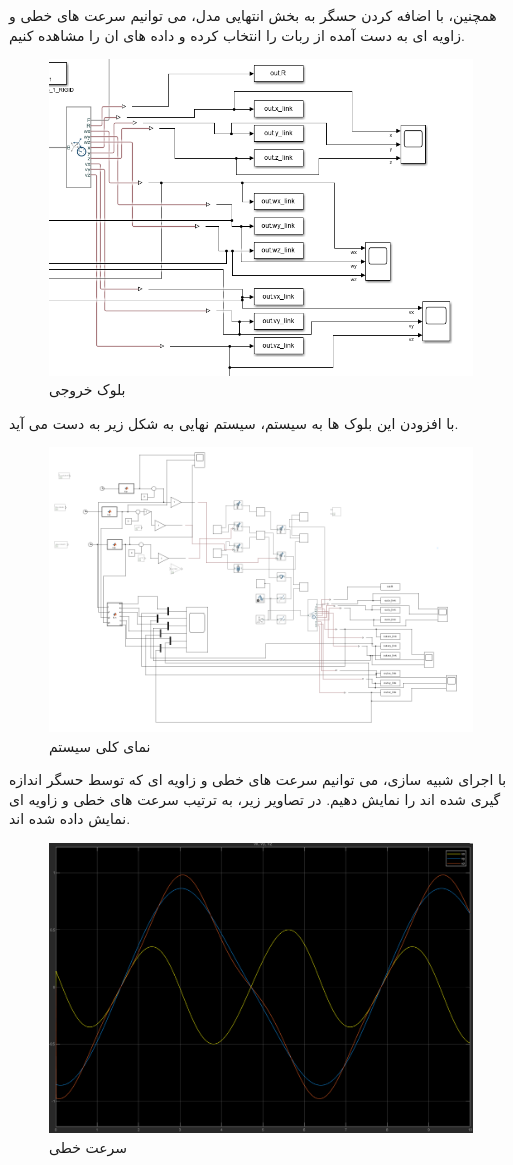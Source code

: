 \FloatBarrier
همچنین، با اضافه کردن حسگر به بخش انتهایی مدل، می توانیم سرعت های خطی و زاویه ای به دست آمده از ربات را انتخاب کرده و داده های ان را مشاهده کنیم.
\begin{figure}[htbp]
	\centering
	\includegraphics[width=0.7\linewidth]{../img/output}
	\caption{بلوک خروجی}
	\label{fig:output}
\end{figure}
\FloatBarrier
با افزودن این بلوک ها به سیستم، سیستم نهایی به شکل زیر به دست می آید.
\begin{figure}[htbp]
	\centering
	\includegraphics[width=0.65\linewidth]{../img/all}
	\caption{نمای کلی سیستم}
	\label{fig:all}
\end{figure}
\FloatBarrier
با اجرای شبیه سازی، می توانیم سرعت های خطی و زاویه ای که توسط حسگر اندازه گیری شده اند را نمایش دهیم. در تصاویر زیر، به ترتیب سرعت های خطی و زاویه ای نمایش داده شده اند.
\begin{figure}[htbp]
	\centering
	\includegraphics[width=0.65\linewidth]{../img/v_out_plot}
	\caption{سرعت خطی}
	\label{fig:voutplot}
\end{figure}
